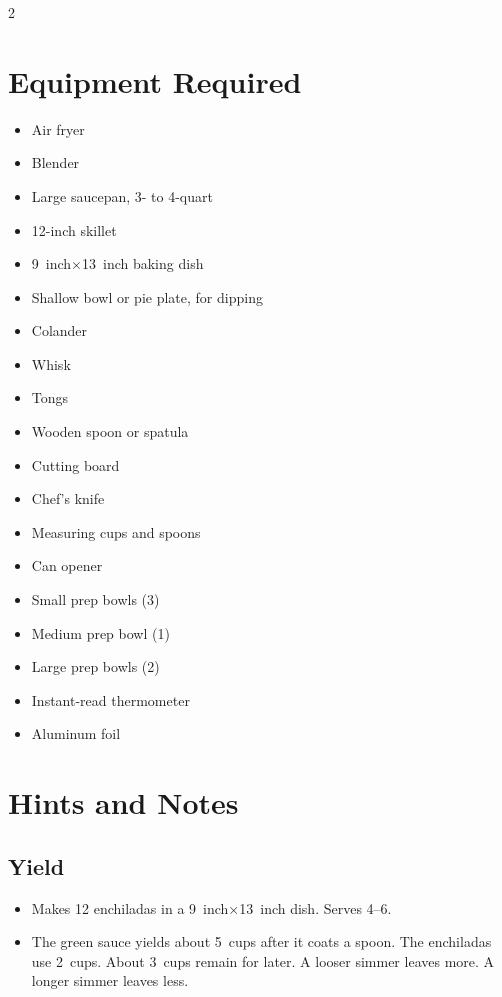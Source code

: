 \documentclass[11pt,letterpaper]{article}
\begin{document}
\newpage

{\small
\setlength{\columnsep}{20pt}
\setlength{\multicolsep}{6pt}
\begin{multicols}{2}
\setlength{\parindent}{0pt}
\setlength{\parskip}{4pt}

\section*{Equipment Required}
\begin{itemize}
    \item Air fryer
    \item Blender
    \item Large saucepan, 3- to 4-quart
    \item 12-inch skillet
    \item 9~inch$\times$13~inch baking dish
    \item Shallow bowl or pie plate, for dipping
    \item Colander
    \item Whisk
    \item Tongs
    \item Wooden spoon or spatula
    \item Cutting board
    \item Chef's knife
    \item Measuring cups and spoons
    \item Can opener
    \item Small prep bowls (3)
    \item Medium prep bowl (1)
    \item Large prep bowls (2)
    \item Instant-read thermometer
    \item Aluminum foil
\end{itemize}

\section*{Hints and Notes}

\subsection*{Yield}
\begin{itemize}
    \item Makes 12 enchiladas in a 9~inch$\times$13~inch dish. Serves 4--6.
    \item The green sauce yields about 5~cups after it coats a spoon. The enchiladas use 2~cups. About 3~cups remain for later. A looser simmer leaves more. A longer simmer leaves less.
\end{itemize}


\end{multicols}}
\end{document}
